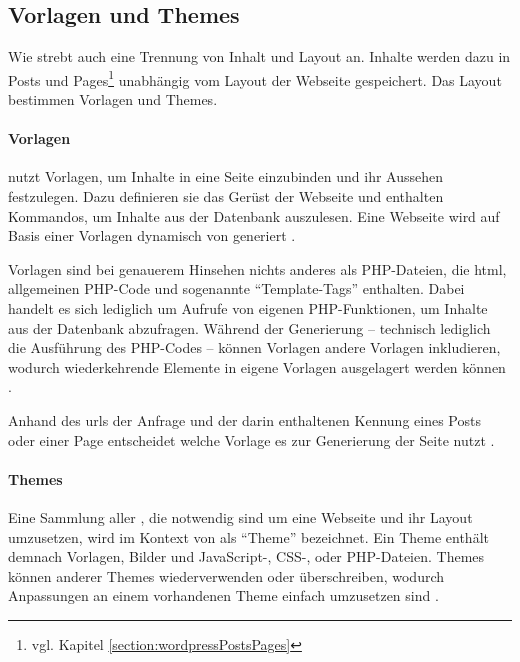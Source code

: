     \subsection{Vorlagen und Themes}
        \label{section:wordpressTemplatesThemes}
        Wie {\imperia} strebt auch {\wordpress} eine Trennung von
        Inhalt und Layout an.
        Inhalte werden dazu in
        Posts und Pages\footnote{vgl. Kapitel \ref{section:wordpressPostsPages}}
        unabhängig vom Layout der Webseite gespeichert.
        Das Layout bestimmen Vorlagen und Themes.

        \paragraph*{Vorlagen}
        {\wordpress} nutzt Vorlagen, um Inhalte in eine Seite einzubinden
        und ihr Aussehen festzulegen.
        Dazu definieren sie das Gerüst der Webseite und enthalten Kommandos,
        um Inhalte aus der Datenbank auszulesen.
        Eine Webseite wird auf Basis einer Vorlagen dynamisch von {\wordpress} generiert
        \cite{wordpress:Templates}.

        Vorlagen sind bei genauerem Hinsehen nichts anderes als PHP-Dateien,
        die \gls{html}, allgemeinen PHP-Code und sogenannte
        "`Template-Tags"' enthalten.
        Dabei handelt es sich lediglich um Aufrufe von
        {\wordpress} eigenen PHP-Funktionen,
        um Inhalte aus der Datenbank abzufragen.
        Während der Generierung -- technisch lediglich die Ausführung
        des PHP-Codes -- können Vorlagen andere Vorlagen inkludieren,
        wodurch wiederkehrende Elemente in eigene Vorlagen ausgelagert
        werden können \cite{wordpress:TemplateFiles}.

        Anhand des \glspl{url} der Anfrage und der darin enthaltenen
        Kennung eines Posts oder einer Page
        entscheidet {\wordpress} welche Vorlage es zur Generierung der Seite nutzt
        \cite{wordpress:TemplateHierarchy}.

        \paragraph*{Themes}
        Eine Sammlung aller {\resources}, die notwendig sind um
        eine Webseite und ihr Layout umzusetzen,
        wird im Kontext von {\wordpress} als "`Theme"' bezeichnet.
        Ein Theme enthält demnach Vorlagen, Bilder und
        JavaScript-, CSS-, oder PHP-Dateien.
        Themes können {\resources} anderer Themes wiederverwenden oder überschreiben,
        wodurch Anpassungen an einem vorhandenen Theme einfach umzusetzen sind
        \cite{wordpress:Themes}.

